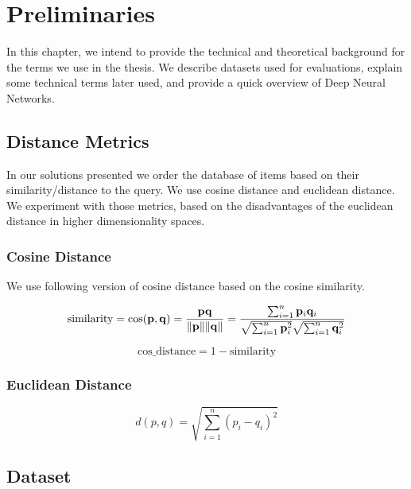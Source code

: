 

\chapter{Preliminaries}
\label{ch:preliminaries}

In this chapter, we intend to provide the technical and theoretical background for the terms we use in the thesis. We describe datasets used for evaluations, explain some technical terms later used, and provide a quick overview of Deep Neural Networks.

\section{Distance Metrics}

In our solutions presented we order the database of items based on their similarity/distance to the query. We use cosine distance and euclidean distance. We experiment with those metrics, based on the disadvantages of the euclidean distance in higher dimensionality spaces.

\subsection{Cosine Distance}

We use following version of cosine distance based on the cosine similarity.

\begin{equation}
\text{similarity} = \cos ({\bf p},{\bf q})= {{\bf p} {\bf q} \over \|{\bf p}\| \|{\bf q}\|} = \frac{ \sum_{i=1}^{n}{{\bf p}_i{\bf q}_i} }{ \sqrt{\sum_{i=1}^{n}{{\bf p}_i^2}} \sqrt{\sum_{i=1}^{n}{{\bf q}_i^2}} }
\end{equation}

\begin{equation}
    \text{cos\_distance} = 1 - \text{similarity}
\end{equation}

\subsection{Euclidean Distance}
\begin{equation}
d(p, q) = \sqrt{\sum_{i=1}^n (p_i - q_i)^2}    
\end{equation}

\section{Dataset}

